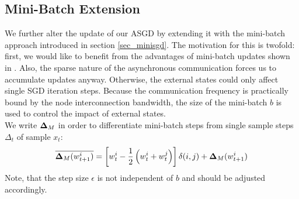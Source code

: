 \documentclass{acm_proc_article-sp}
\begin{document}
\subsection{Mini-Batch Extension}
We further alter the update of our ASGD by extending it with the mini-batch 
approach introduced
in section \ref{sec_minisgd}. The motivation for this is twofold: first, we would 
like to benefit from the advantages of mini-batch updates shown in 
\cite{sculley2010web}. Also, the sparse nature of the asynchronous communication 
forces us to accumulate updates anyway. Otherwise, the external states could only
affect single SGD iteration steps. Because the communication frequency is 
practically bound by the node interconnection bandwidth, the size of the 
mini-batch $b$ is used to control the impact of external states.\\    
We write ${\bf\Delta}_M$ in order to differentiate mini-batch steps
from single sample steps $\Delta_t$ of sample $x_t$:   
\begin{equation}
\overline{{\bf\Delta}_M(w^i_{t+1})}=\left[w^i_t-{1\over 2}\left( w^i_t + w^j_t \right)\right]
\delta(i,j) + 
{\bf\Delta}_M(w^i_{t+1})
\label{eq_ASGD_miniB}
\end{equation}
Note, that the step size $\epsilon$ is not independent of $b$ and should be 
adjusted accordingly.\\ 
\end{document}
